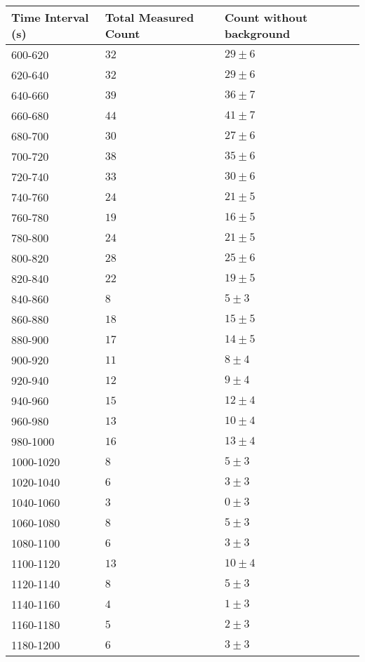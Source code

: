 \begin{tabular}{| p{} | p{} | p{} |}\hline
Time Interval (s) & Total Measured Count & Count without background\\
\hline
600-620 & $32$ & $29\pm 6$\\
620-640 & $32$ & $29\pm 6$\\
640-660 & $39$ & $36\pm 7$\\
660-680 & $44$ & $41\pm 7$\\
680-700 & $30$ & $27\pm 6$\\
700-720 & $38$ & $35\pm 6$\\
720-740 & $33$ & $30\pm 6$\\
740-760 & $24$ & $21\pm 5$\\
760-780 & $19$ & $16\pm 5$\\
780-800 & $24$ & $21\pm 5$\\
800-820 & $28$ & $25\pm 6$\\
820-840 & $22$ & $19\pm 5$\\
840-860 & $8$ & $5\pm 3$\\
860-880 & $18$ & $15\pm 5$\\
880-900 & $17$ & $14\pm 5$\\
900-920 & $11$ & $8\pm 4$\\
920-940 & $12$ & $9\pm 4$\\
940-960 & $15$ & $12\pm 4$\\
960-980 & $13$ & $10\pm 4$\\
980-1000 & $16$ & $13\pm 4$\\
1000-1020 & $8$ & $5\pm 3$\\
1020-1040 & $6$ & $3\pm 3$\\
1040-1060 & $3$ & $0\pm 3$\\
1060-1080 & $8$ & $5\pm 3$\\
1080-1100 & $6$ & $3\pm 3$\\
1100-1120 & $13$ & $10\pm 4$\\
1120-1140 & $8$ & $5\pm 3$\\
1140-1160 & $4$ & $1\pm 3$\\
1160-1180 & $5$ & $2\pm 3$\\
1180-1200 & $6$ & $3\pm 3$\\
\hline
\end{tabular}